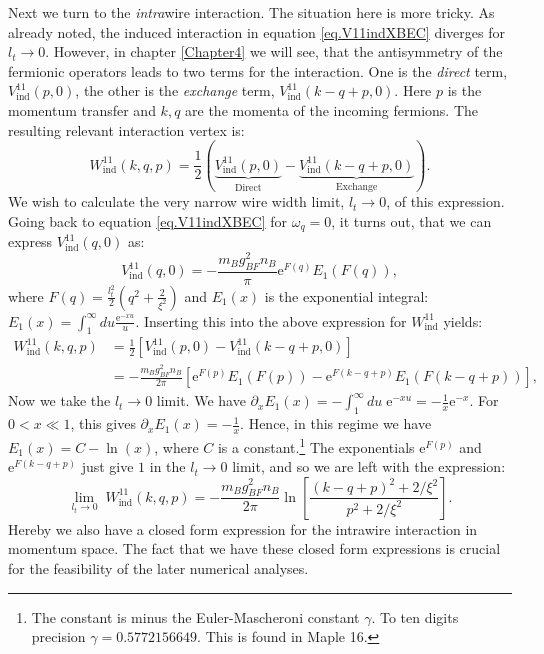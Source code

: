 Next we turn to the \textit{intra}wire interaction. The situation here is more tricky. As already noted, the induced interaction in equation \eqref{eq.V11indXBEC} diverges for $l_t \to 0$. However, in chapter \ref{Chapter4} we will see, that the antisymmetry of the fermionic operators leads to two terms for the interaction. One is the \textit{direct} term, $V^{11}_{\text{ind}}\left( p, 0 \right)$, the other is the \textit{exchange} term, $V^{11}_{\text{ind}}\left( k - q + p, 0 \right)$. Here $p$ is the momentum transfer and $k, q$ are the momenta of the incoming fermions. The resulting relevant interaction vertex is: 
\begin{equation}
W^{11}_{\text{ind}}(k, q, p) = \frac{1}{2} ( \underset{\text{Direct}}{\underbrace{V^{11}_{\text{ind}}\left( p, 0 \right)}} - \underset{\text{Exchange}}{\underbrace{V^{11}_\text{ind}\left( k - q + p, 0 \right) }} ). 
\label{eq.Wkqp.scattering.amplitude}
\end{equation}
We wish to calculate the very narrow wire width limit, $l_t \to 0$, of this expression. Going back to equation \eqref{eq.V11indXBEC} for $\omega_q = 0$, it turns out, that we can express $V^{11}_\text{ind}\left( q, 0 \right)$ as:
\begin{equation}
V^{11}_{\text{ind}}(q, 0) = -\frac{m_Bg_{BF}^2n_B}{\pi} \text{e}^{F(q)} E_1(F(q)),
\label{eq.V11indq.zerofrequency.ltnonzero}
\end{equation}
where $F(q) = \frac{l_t^2}{2}\left(q^2 + \frac{2}{\xi^2} \right)$ and $E_1(x)$ is the exponential integral: $E_1(x) = \int_1^\infty du \frac{\text{e}^{-xu}}{u}$. Inserting this into the above expression for $W^{11}_{\text{ind}}$ yields:
\begin{align}
W^{11}_{\text{ind}}(k, q, p) &= \frac{1}{2}\left[V^{11}_\text{ind}(p, 0) - V^{11}_\text{ind}(k - q + p, 0)\right] \nonumber \\
&= -\frac{m_Bg_{BF}^2n_B}{2\pi}\left[ \text{e}^{F(p)} E_1(F(p)) - \text{e}^{F(k - q + p)} E_1(F(k - q + p)) \right], \nonumber
\end{align}
Now we take the $l_t \to 0$ limit. We have $\partial_x E_1(x) = -\int_1^{\infty}du\; \text{e}^{-xu} = -\frac{1}{x}\text{e}^{-x}$. For $0 < x \ll 1$, this gives $\partial_xE_1(x) = -\frac{1}{x}$. Hence, in this regime we have $E_1(x) = C -\ln(x)$, where $C$ is a constant.\footnote{The constant is minus the Euler-Mascheroni constant $\gamma$. To ten digits precision $\gamma = 0.5772156649$. This is found in Maple 16.} The exponentials $\text{e}^{F(p)}$ and $\text{e}^{F(k - q + p)}$ just give $1$ in the $l_t \to 0$ limit, and so we are left with the expression:
\begin{equation}
\lim_{l_t \to 0} \; W^{11}_{\text{ind}}(k, q, p) = -\frac{m_Bg_{BF}^2n_B}{2\pi} \ln\left[\frac{(k - q + p)^2 + 2/\xi^2}{p^2 + 2/\xi^2}\right].
\label{eq.Wkqp.scattering.amplitude.lt=0} 
\end{equation}
Hereby we also have a closed form expression for the intrawire interaction in momentum space. The fact that we have these closed form expressions is crucial for the feasibility of the later numerical analyses.




